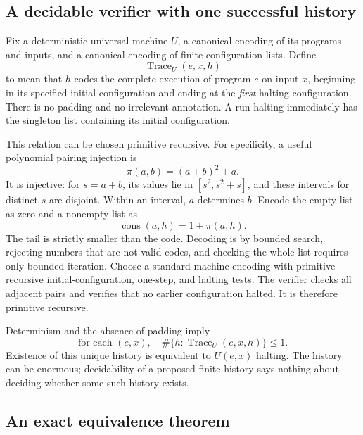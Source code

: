 \documentclass[11pt,a4paper]{article}
\theoremstyle{definition}
\theoremstyle{remark}
\begin{document}
\subsection{A decidable verifier with one successful history}
Fix a deterministic universal machine $U$, a canonical encoding of its programs and inputs, and a canonical encoding of finite configuration lists. Define
\[
\operatorname{Trace}_U(e,x,h)
\]
to mean that $h$ codes the complete execution of program $e$ on input $x$, beginning in its specified initial configuration and ending at the \emph{first} halting configuration. There is no padding and no irrelevant annotation. A run halting immediately has the singleton list containing its initial configuration.

This relation can be chosen primitive recursive. For specificity, a useful polynomial pairing injection is
\begin{equation}\label{cdc:eq:pair}
\pi(a,b)=(a+b)^2+a.
\end{equation}
It is injective: for $s=a+b$, its values lie in $[s^2,s^2+s]$, and these intervals for distinct $s$ are disjoint. Within an interval, $a$ determines $b$. Encode the empty list as zero and a nonempty list as
\[
\operatorname{cons}(a,h)=1+\pi(a,h).
\]
The tail is strictly smaller than the code. Decoding is by bounded search, rejecting numbers that are not valid codes, and checking the whole list requires only bounded iteration. Choose a standard machine encoding with primitive-recursive initial-configuration, one-step, and halting tests. The verifier checks all adjacent pairs and verifies that no earlier configuration halted. It is therefore primitive recursive.

Determinism and the absence of padding imply
\begin{equation}\label{cdc:eq:onehistory}
\text{for each }(e,x),\quad
\#\{h:\operatorname{Trace}_U(e,x,h)\}\le1.
\end{equation}
Existence of this unique history is equivalent to $U(e,x)$ halting. The history can be enormous; decidability of a proposed finite history says nothing about deciding whether some such history exists.

\subsection{An exact equivalence theorem}
\end{document}
